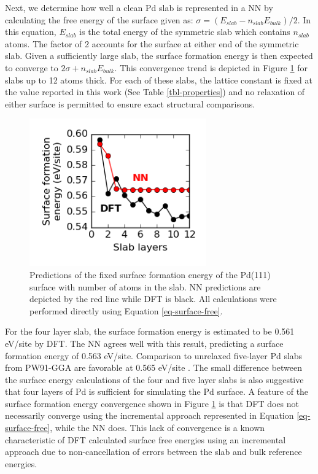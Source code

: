 \documentclass[12pt]{cmuthesis}
\begin{document}
Next, we determine how well a clean Pd slab is represented in a NN by calculating the free energy of the surface given as: \(\sigma = (E_{slab} - n_{slab} E_{bulk})/2\). In this equation, \(E_{slab}\) is the total energy of the symmetric slab which contains \(n_{slab}\) atoms. The factor of 2 accounts for the surface at either end of the symmetric slab. Given a sufficiently large slab, the surface formation energy is then expected to converge to \(2 \sigma + n_{slab} E_{bulk}\). This convergence trend is depicted in Figure \ref{fig-surface-energy} for slabs up to 12 atoms thick. For each of these slabs, the lattice constant is fixed at the value reported in this work (See Table \ref{tbl-properties}) and no relaxation of either surface is permitted to ensure exact structural comparisons.

\begin{figure}[htbp]
\centering
\includegraphics[width=3in]{./images/surface-energy.png}
\caption{\label{fig-surface-energy}
Predictions of the fixed surface formation energy of the Pd(111) surface with number of atoms in the slab. NN predictions are depicted by the red line while DFT is black. All calculations were performed directly using Equation \ref{eq-surface-free}.}
\end{figure}

For the four layer slab, the surface formation energy is estimated to be 0.561 eV/site by DFT. The NN agrees well with this result, predicting a surface formation energy of 0.563 eV/site. Comparison to unrelaxed five-layer Pd slabs from PW91-GGA are favorable at 0.565 eV/site \cite{frey-2014-implic-cover}. The small difference between the surface energy calculations of the four and five layer slabs is also suggestive that four layers of Pd is sufficient for simulating the Pd surface. A feature of the surface formation energy convergence shown in Figure \ref{fig-surface-energy} is that DFT does not necessarily converge using the incremental approach represented in Equation \ref{eq-surface-free}, while the NN does. This lack of convergence is a known characteristic of DFT calculated surface free energies using an incremental approach \cite{fiolhais-2003-extrac-alumin} due to non-cancellation of errors between the slab and bulk reference energies.
\end{document}
